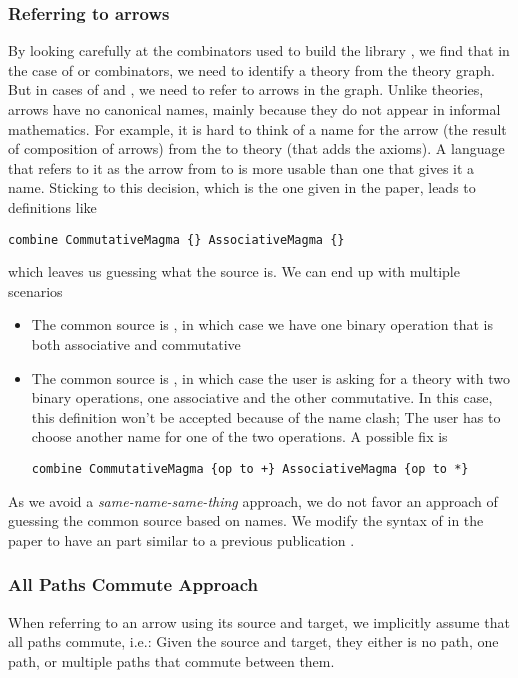 \subsubsection{Referring to arrows}
By looking carefully at the combinators used to build the library , we find that in the case of  or  combinators, we need to identify a theory from the theory graph. But in cases of  and , we need to refer to arrows in the graph. Unlike theories, arrows have no canonical names, mainly because they do not appear in informal mathematics. For example, it is hard to think of a name for the arrow (the result of composition of arrows) from the  to  theory (that adds the axioms). A language that refers to it as the arrow from  to  is more usable than one that gives it a name. Sticking to this decision, which is the one given in the paper, leads to definitions like 
\begin{lstlisting}
combine CommutativeMagma {} AssociativeMagma {}
\end{lstlisting}
which leaves us guessing what the source is. We can end up with multiple scenarios 
\begin{itemize}
    \item The common source is , in which case we have one binary operation that is both associative and commutative 
    \item The common source is , in which case the user is asking for a theory with two binary operations, one associative and the other commutative. In this case, this definition won't be accepted because of the name clash; The user has to choose another name for one of the two operations. A possible fix is 
    \begin{lstlisting}
combine CommutativeMagma {op to +} AssociativeMagma {op to *}
    \end{lstlisting}
\end{itemize}

As we avoid a \emph{same-name-same-thing} approach, we do not favor an approach of guessing the common source based on names. We modify the syntax of  in the paper to have an  part similar to a previous publication \cite{CaretteOConnorTPC}. 

\subsubsection{All Paths Commute Approach} 
When referring to an arrow using its source and target, we implicitly assume that all paths commute, i.e.: Given the source and target, they either is no path, one path, or multiple paths that commute between them. 

